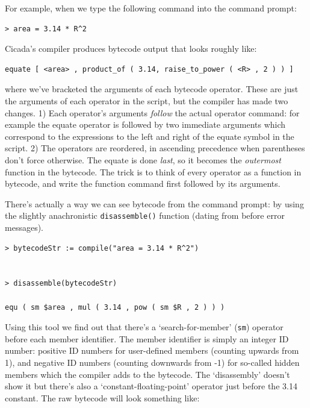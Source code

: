 \documentclass{article}
\newenvironment{code}{
       \begin{list}{}{
               \setlength{\leftmargin}{.4in}
               \setlength{\rightmargin}{0in}
               \setlength{\topsep}{.2in}
       }
       \small
       \item[] }
       { \end{list}   }
\begin{document}
For example, when we type the following command into the command prompt:

\begin{code} \begin{verbatim}
> area = 3.14 * R^2
\end{verbatim} \end{code}

\noindent Cicada's compiler produces bytecode output that looks roughly like:

\begin{code} \begin{verbatim}
equate [ <area> , product_of ( 3.14, raise_to_power ( <R> , 2 ) ) ]
\end{verbatim} \end{code}

\noindent where we've bracketed the arguments of each bytecode operator.  These are just the arguments of each operator in the script, but the compiler has made two changes.  1) Each operator's arguments \emph{follow} the actual operator command:  for example the equate operator is followed by two immediate arguments which correspond to the expressions to the left and right of the equate symbol in the script.  2) The operators are reordered, in ascending precedence when parentheses don't force otherwise.  The equate is done \emph{last}, so it becomes the \emph{outermost} function in the bytecode.  The trick is to think of every operator as a function in bytecode, and write the function command first followed by its arguments.

There's actually a way we can see bytecode from the command prompt:  by using the slightly anachronistic \verb#disassemble()# function (dating from before error messages).

\begin{code} \begin{verbatim}
> bytecodeStr := compile("area = 3.14 * R^2")


> disassemble(bytecodeStr)

equ ( sm $area , mul ( 3.14 , pow ( sm $R , 2 ) ) )
\end{verbatim} \end{code}

\noindent Using this tool we find out that there's a `search-for-member' (\verb#sm#) operator before each member identifier.  The member identifier is simply an integer ID number:  positive ID numbers for user-defined members (counting upwards from 1), and negative ID numbers (counting downwards from -1) for so-called hidden members which the compiler adds to the bytecode.  The `disassembly' doesn't show it but there's also a `constant-floating-point' operator just before the 3.14 constant.  The raw bytecode will look something like:
\end{document}
